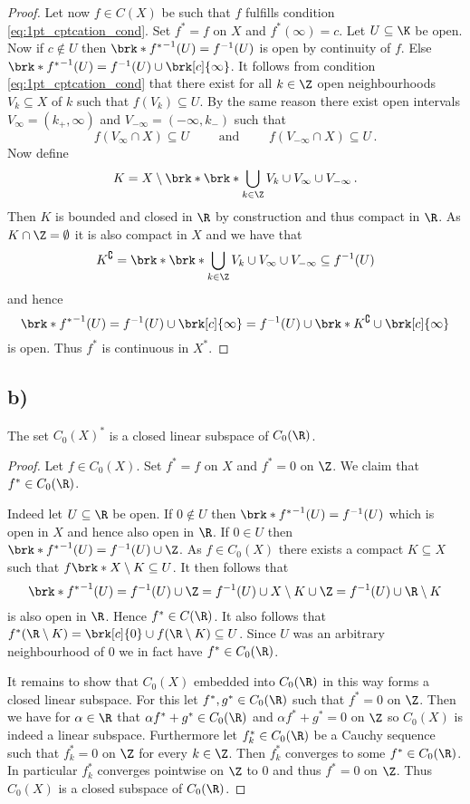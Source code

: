 \begin{proof}
Let now $f\in C(X)$ be such that $f$ fulfills condition \ref{eq:1pt_cptcation_cond}. Set $f^*=f$ on $X$ and $f^*(\infty) = c$. 
Let $U\subseteq \K$ be open. Now if $c\notin U$ then $\brk*{f^*}^{-1}(U)=f^{-1}(U)$ is open by continuity of $f$. Else $\brk*{f^*}^{-1}(U)=f^{-1}(U)\cup\brk[c]{\infty}$. It follows from condition \ref{eq:1pt_cptcation_cond} that there exist for all $k\in\Z$ open neighbourhoods $V_k\subseteq X$ of $k$ such that $f(V_k)\subseteq U$. By the same reason there exist open intervals $V_\infty=(k_+, \infty)$ and $V_{-\infty}=(-\infty,k_{-})$ such that
$$f(V_\infty\cap X)\subseteq U \qquad\text{ and }\qquad f(V_{-\infty}\cap X)\subseteq U\,.$$
Now define
$$K=X\setminus \brk*{\brk*{\bigcup_{k\in\Z}V_k}\cup V_\infty\cup V_{-\infty}}\,.$$
Then $K$ is bounded and closed in $\R$ by construction and thus compact in $\R$. As $K\cap\Z=\emptyset$ it is also compact in $X$ and we have that 
$$K^\complement=\brk*{\brk*{\bigcup_{k\in\Z}V_k}\cup V_\infty\cup V_{-\infty}}\subseteq f^{-1}(U)$$
and hence 
$$\brk*{f^*}^{-1}(U)=f^{-1}(U)\cup\brk[c]{\infty}=f^{-1}(U)\cup \brk*{K^\complement\cup\brk[c]{\infty}}$$
is open. Thus $f^*$ is continuous in $X^*$.
\end{proof}

\subsection{b)}

\begin{claim}
The set $C_0(X)^*$ is a closed linear subspace of $C_0(\R)$.
\end{claim}
\begin{proof}
Let $f\in C_0(X)$. Set $f^*=f$ on $X$ and $f^*=0$ on $\Z$. We claim that $f^*\in C_0(\R)$. 

Indeed let $U\subseteq \R$ be open. If $0\notin U$ then $\brk*{f^*}^{-1}(U)=f^{-1}(U)$ which is open in $X$ and hence also open in $\R$. If $0\in U$ then $\brk*{f^*}^{-1}(U)=f^{-1}(U)\cup \Z$. As $f\in C_0(X)$ there exists a compact $K\subseteq X$ such that $f\brk*{X\setminus K}\subseteq U$. It then follows that
$$\brk*{f^*}^{-1}(U)=f^{-1}(U)\cup \Z=f^{-1}(U)\cup X\setminus K\cup\Z=f^{-1}(U)\cup\R\setminus K$$
is also open in $\R$. Hence $f^*\in C(\R)$. It also follows that $f^*(\R\setminus K)=\brk[c]{0}\cup f(\R\setminus K)\subseteq U$. Since $U$ was an arbitrary neighbourhood of $0$ we in fact have $f^*\in C_0(\R)$.

It remains to show that $C_0(X)$ embedded into $C_0(\R)$ in this way forms a closed linear subspace. For this let $f^*,g^*\in C_0(\R)$ such that $f^*=0$ on $\Z$. Then we have for $\alpha\in\R$ that $\alpha f^*+g^*\in C_0(\R)$ and $\alpha f^*+g^*=0$ on $\Z$ so $C_0(X)$ is indeed a linear subspace. Furthermore let $f_k^*\in C_0(\R)$ be a Cauchy sequence such that $f_k^*=0$ on $\Z$ for every $k\in\Z$. Then $f_k^*$ converges to some $f^*\in C_0(\R)$. In particular $f_k^*$ converges pointwise on $\Z$ to $0$ and thus $f^*=0$ on $\Z$. Thus $C_0(X)$ is a closed subspace of $C_0(\R)$.
\end{proof}

